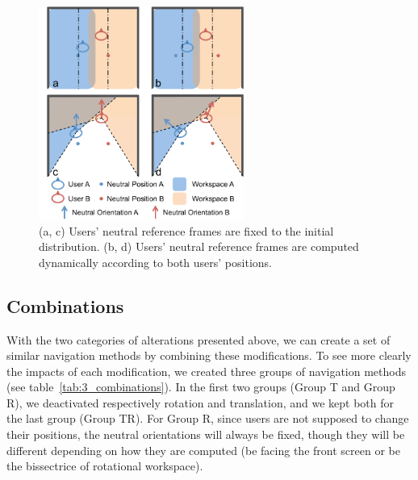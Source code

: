 \begin{figure}[tb]
  \centering
  \includegraphics[width=0.6\textwidth]{figures/ch3/neutral_ref}
  \caption{\label{fig:3_neutral_ref}(a, c) Users' neutral reference frames are fixed to the initial distribution. (b, d) Users' neutral reference frames are computed dynamically according to both users' positions.}
\end{figure}

\subsection{Combinations}
With the two categories of alterations presented above, we can create a set of similar navigation methods by combining these modifications. To see more clearly the impacts of each modification, we created three groups of navigation methods (see table~\ref{tab:3_combinations}). In the first two groups (Group T and Group R), we deactivated respectively rotation and translation, and we kept both for the last group (Group TR). For Group R, since users are not supposed to change their positions, the neutral orientations will always be fixed, though they will be different depending on how they are computed (be facing the front screen or be the bissectrice of rotational workspace).

